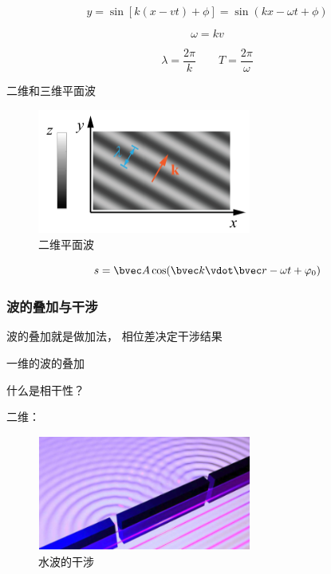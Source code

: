 \begin{equation}
y = \sin[k(x-vt) + \phi] = \sin(kx - \omega t + \phi)
\end{equation}

\begin{equation}
\omega = kv
\end{equation}

\begin{equation}
\lambda = \frac{2\pi}{k}
\qquad
T = \frac{2\pi}{\omega}
\end{equation}

二维和三维平面波

\begin{figure}[ht]
\centering
\includegraphics[width=7cm]{./figures/QMIntr6.png}
\caption{二维平面波} \label{QMIntr_fig6}
\end{figure}

\begin{equation}
s = \bvec A \cos(\bvec k \vdot \bvec r - \omega t + \varphi_0)
\end{equation}


\subsubsection{波的叠加与干涉}

波的叠加就是做加法， 相位差决定干涉结果

一维的波的叠加

什么是相干性？

二维：

\begin{figure}[ht]
\centering
\includegraphics[width=7cm]{./figures/QMIntr4.png}
\caption{水波的干涉} \label{QMIntr_fig4}
\end{figure}

